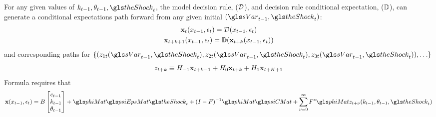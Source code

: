 \documentclass[12pt]{article}
\begin{document}
For any given values of $k_{t-1},\theta_{t-1}, \theShock_t$, the model decision rule, ($\mathcal{D}$), and decision rule conditional expectation, ($\mathbb{D}$), can generate a conditional expectations path forward from  any given initial $\tArg$:
\begin{gather*}
  \mathbf{x}_t({x_{t-1},\epsilon_t})=\mathcal{D}({x_{t-1},\epsilon_t})\\
  \mathbf{x}_{t+k+1}({x_{t-1},\epsilon_t})=\mathbb{D}(\mathbf{x}_{t+k}({x_{t-1},\epsilon_t}))
\end{gather*}
and corresponding paths for $\{(z_{1t}\tArg, z_{2t}\tArg, z_{3t}\tArg),\ldots\}$
\begin{gather*}
  z_{t+k} \equiv H_{-1} \mathbf{x}_{t+k-1} +  H_0 \mathbf{x}_{t+k} +  H_1 \mathbf{x}_{t+K+1} 
\end{gather*}
Formula  requires that
\begin{gather*}
\xWOarg(\xtmEpsArg)=
B   \begin{bmatrix}
c_{t-1}\\
k_{t-1}\\
\theta_{t-1}
  \end{bmatrix}  + \phiMat \psiEpsMat\theShock_t + (I - F)^{-1} \phiMat \psiCMat + \sum_{\sForSum=0}^\infty F^s \phiMat z_{t+\sForSum}(k_{t-1},\theta_{t-1}, \theShock_t) 
\end{gather*}
\end{document}

